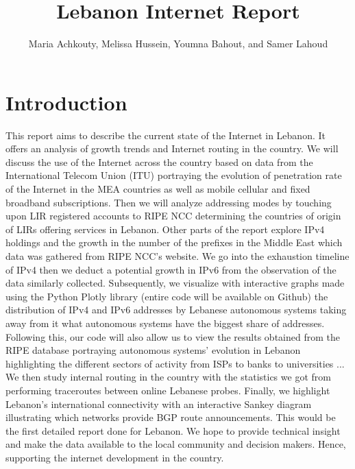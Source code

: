 \documentclass[a4paper,titlepage]{article}
\title{\color{astral}\Huge \bfseries Lebanon Internet Report}
\author{Maria Achkouty, Melissa Hussein, Youmna Bahout, and Samer Lahoud}
\begin{document}
\maketitle

\begin{abstract}

\end{abstract}

\section{Introduction}
This report aims to describe the current state of the Internet in Lebanon. It offers an analysis of growth trends and Internet routing in the country.
We will discuss the use of the Internet across the country based on data from the International Telecom Union (ITU) portraying the evolution of penetration rate of the Internet in the MEA countries as well as mobile cellular and fixed broadband subscriptions.
Then we will analyze addressing modes by touching upon LIR registered accounts to RIPE NCC determining the countries of origin of LIRs offering services in Lebanon.
Other parts of the report explore IPv4 holdings and the growth in the number of the prefixes in the Middle East which data was gathered from RIPE NCC’s website. We go into the exhaustion timeline of IPv4 then we deduct a potential growth in IPv6 from the observation of the data similarly collected.
Subsequently, we visualize with interactive graphs made using the Python Plotly library (entire code will be available on Github) the distribution of IPv4 and IPv6 addresses by Lebanese autonomous systems taking away from it what autonomous systems have the biggest share of addresses.
Following this, our code will also allow us to view the results obtained from the RIPE database portraying autonomous systems’ evolution in Lebanon highlighting the different sectors of activity from ISPs to banks to universities ...
We then study internal routing in the country with the statistics we got from performing traceroutes between online Lebanese probes.
Finally, we highlight Lebanon’s international connectivity with an interactive Sankey diagram illustrating which networks provide BGP route announcements.
This would be the first detailed report done for Lebanon. We hope to provide technical insight and make the data available to the local community and decision makers. Hence, supporting the internet development in the country.
 
\end{document}
